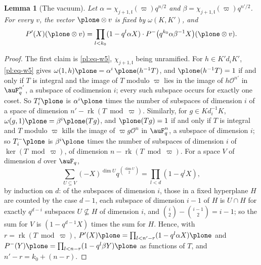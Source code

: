 \documentclass[10pt]{amsart}
\newtheorem{lemma}[theorem]{Lemma}
\theoremstyle{definition}
\theoremstyle{remark}
\providecommand{\auO}{\mathcal O}
\begin{document}
\begin{lemma}[The vacuum]\label{pl:vac}
Let $\alpha=\chi_{j+1,\mathfrak l}(\varpi)q^{n/2}$ and $\beta=\chi_{j+1,\mathfrak l}(\varpi)
q^{n'/2}$. For every $v$, the vector $\plone\otimes v$ is fixed by $\omega(K,K')$, and
\[
P'(X)(\plone\otimes v)=\prod_{l<k_0}(1-q^l\alpha X)\cdot P^-\bigl(q^{k_0}\alpha\beta^{-1}X\bigr)
(\plone\otimes v).
\]
\end{lemma}
\begin{proof}
The first claim is \eqref{pl:eq-w5}, $\chi_{j+1,\mathfrak l}$ being unramified. For $h\in
K'd_iK'$, \eqref{pl:eq-w5} gives $\omega(1,h)\plone=\alpha^i\,\plone(h^{-1}T)$, and $\plone(h^{-1}
T)=1$ if and only if $T$ is integral and the image of $T$ modulo $\varpi$ lies in the image of
$h\auO^{n'}$ in $\auF_q^{n'}$, a subspace of codimension $i$; every such subspace occurs for
exactly one coset. So $T'_i\plone$ is $\alpha^i\plone$ times the number of subspaces of dimension
$i$ of a space of dimension $n'-\operatorname{rk}(T\bmod\varpi)$. Similarly, for $g\in
Kd_i^{-1}K$, $\omega(g,1)\plone=\beta^i\plone(Tg)$, and $\plone(Tg)=1$ if and only if $T$ is
integral and $T$ modulo $\varpi$ kills the image of $\varpi g\auO^n$ in $\auF_q^n$, a subspace of
dimension $i$; so $T^-_i\plone$ is $\beta^i\plone$ times the number of subspaces of dimension $i$
of $\ker(T\bmod\varpi)$, of dimension $n-\operatorname{rk}(T\bmod\varpi)$. For a space $V$ of
dimension $d$ over $\auF_q$,
\begin{equation}\label{pl:eq-qbin}
\sum_{U\subseteq V}(-X)^{\dim U}q^{\binom{\dim U}2}=\prod_{l<d}(1-q^lX),
\end{equation}
by induction on $d$: of the subspaces of dimension $i$, those in a fixed hyperplane $H$ are
counted by the case $d-1$, each subspace of dimension $i-1$ of $H$ is $U\cap H$ for exactly
$q^{d-i}$ subspaces $U\not\subseteq H$ of dimension $i$, and $\binom i2-\binom{i-1}2=i-1$; so the
sum for $V$ is $(1-q^{d-1}X)$ times the sum for $H$. Hence, with
$r=\operatorname{rk}(T\bmod\varpi)$, $P'(X)\plone=\prod_{l<n'-r}(1-q^l\alpha X)\plone$ and
$P^-(Y)\plone=\prod_{l<n-r}(1-q^l\beta Y)\plone$ as functions of $T$, and $n'-r=k_0+(n-r)$.
\end{proof}
\end{document}
